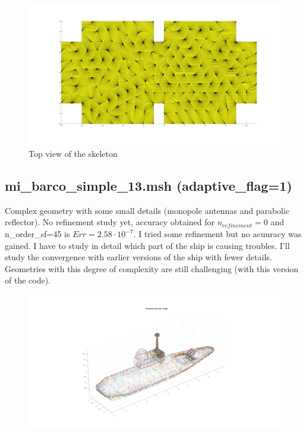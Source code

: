 \documentclass[11pt, oneside]{article}   	%
\begin{document}
\begin{figure}[H]
\begin{center}
\includegraphics[width=6in]{two_cavity_filter_skeleton_2.pdf}
\end{center}
\caption{Top view of the skeleton}
\label{two_cavity_filter_skeleton}
\end{figure}


\newpage

\subsection{mi\_barco\_simple\_13.msh (adaptive\_flag=1)}
Complex geometry with some small details (monopole antennas and parabolic reflector). No refinement study yet, accuracy obtained for $n_{refinement}=0$ and n\_order\_sf=45 is $Err=2.58\cdot 10^{-7}$. I tried some refinement but no acuuracy was gained. I have to study in detail which part of the ship is causing troubles. I'll study the convergence with earlier versions of the ship with fewer details. Geometries with this degree of complexity are still challenging (with this version of the code).



\begin{figure}[H]
\begin{center}
\includegraphics[width=7in]{war_ship_1.pdf}
\end{center}
\caption{}
\label{war_ship_1}
\end{figure}
\end{document}
